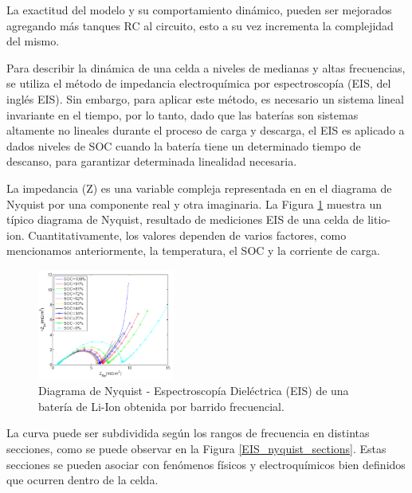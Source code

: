 \documentclass[10pt,a4paper]{article}
\newcounter{subsubsubsection}[subsubsection]
\begin{document}
\noindent La exactitud del modelo y su comportamiento din\'amico, pueden ser 
mejorados agregando m\'as tanques RC al circuito, esto a su vez incrementa la
complejidad del mismo. 


\noindent Para describir la din\'amica de una celda a niveles de medianas y 
altas frecuencias, se utiliza el m\'etodo de impedancia electroqu\'imica por 
espectroscop\'ia (\acrshort{EIS}, del ingl\'es \acrlong{EIS}). Sin embargo, para
aplicar este m\'etodo, es necesario un sistema lineal invariante en el tiempo,
por lo tanto, dado que las bater\'ias son sistemas altamente no lineales durante
el proceso de carga y descarga, el \acrshort{EIS} es aplicado a dados niveles de
\acrshort{SOC} cuando la bater\'ia tiene un determinado tiempo de descanso, para
garantizar determinada linealidad necesaria.

\noindent La impedancia (Z) es una variable compleja representada en en el 
diagrama de Nyquist por una componente real y otra imaginaria. 
La Figura \ref{EIS_Nyquist} muestra un t\'ipico diagrama de Nyquist, 
resultado de mediciones \acrshort{EIS} de una celda de litio-ion. 
Cuantitativamente, los valores dependen de varios factores, como mencionamos 
anteriormente, la temperatura, el \acrshort{SOC} y la corriente de carga.

\begin{figure}[h!]
    \begin{center}
	\includegraphics[width=0.4\textwidth]{EIS_Nyquist.png}
	\caption{Diagrama de Nyquist - Espectroscopía Dieléctrica (EIS) de 
	una batería de Li-Ion obtenida por barrido frecuencial.}
	\label{EIS_Nyquist}
    \end{center}
\end{figure}

\newpage

\noindent La curva puede ser subdividida seg\'un los rangos de frecuencia en
distintas secciones, como se puede observar en la Figura
\ref{EIS_nyquist_sections}. Estas secciones se pueden asociar con fen\'omenos 
f\'isicos y electroqu\'imicos bien definidos que ocurren dentro de la celda.
\end{document}
